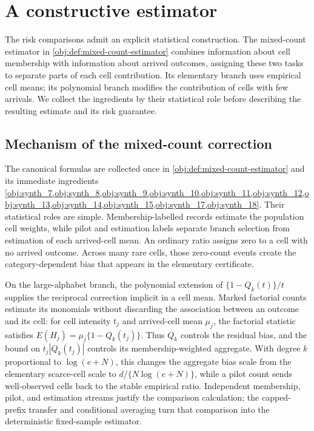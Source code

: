 \section{A constructive estimator}\label{sec:constructive-estimator}

The risk comparisons admit an explicit statistical construction. The mixed-count estimator in \cref{obj:def:mixed-count-estimator} combines information about cell membership with information about arrived outcomes, assigning these two tasks to separate parts of each cell contribution. Its elementary branch uses empirical cell means; its polynomial branch modifies the contribution of cells with few arrivals. We collect the ingredients by their statistical role before describing the resulting estimate and its risk guarantee.

\subsection{Mechanism of the mixed-count correction}

The canonical formulas are collected once in \cref{obj:def:mixed-count-estimator} and its immediate ingredients \cref{obj:synth_7,obj:synth_8,obj:synth_9,obj:synth_10,obj:synth_11,obj:synth_12,obj:synth_13,obj:synth_14,obj:synth_15,obj:synth_17,obj:synth_18}. Their statistical roles are simple. Membership-labelled records estimate the population cell weights, while pilot and estimation labels separate branch selection from estimation of each arrived-cell mean. An ordinary ratio assigns zero to a cell with no arrived outcome. Across many rare cells, those zero-count events create the category-dependent bias that appears in the elementary certificate.

On the large-alphabet branch, the polynomial extension of \(\{1-Q_k(t)\}/t\) supplies the reciprocal correction implicit in a cell mean. Marked factorial counts estimate its monomials without discarding the association between an outcome and its cell: for cell intensity \(t_j\) and arrived-cell mean \(\mu_j\), the factorial statistic satisfies \(E(H_j)=\mu_j\{1-Q_k(t_j)\}\). Thus \(Q_k\) controls the residual bias, and the bound on \(t_j|Q_k(t_j)|\) controls its membership-weighted aggregate. With degree \(k\) proportional to \(\log(e+N)\), this changes the aggregate bias scale from the elementary scarce-cell scale to \(d/\{N\log(e+N)\}\), while a pilot count sends well-observed cells back to the stable empirical ratio. Independent membership, pilot, and estimation streams justify the comparison calculation; the capped-prefix transfer and conditional averaging turn that comparison into the deterministic fixed-sample estimator.

